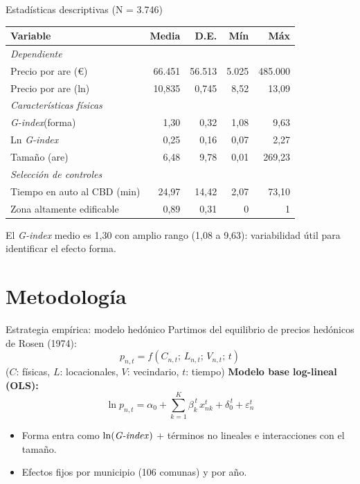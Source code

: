 \documentclass[11pt,aspectratio=169]{beamer}
\newcommand{\Gindex}{\textit{G-index}\xspace}
\begin{document}
\begin{frame}{Estadísticas descriptivas (N = 3.746)}
  \centering
  \begin{table}\small
  \begin{tabular}{lrrrr}
    \toprule
    Variable & Media & D.E. & Mín & Máx \\
    \midrule
    \multicolumn{5}{l}{\itshape Dependiente}\\
    Precio por are (€) & 66.451 & 56.513 & 5.025 & 485.000 \\
    Precio por are (ln) & 10,835 & 0,745 & 8,52 & 13,09 \\
    \midrule
    \multicolumn{5}{l}{\itshape Características físicas}\\
    \Gindex (forma) & 1,30 & 0,32 & 1,08 & 9,63 \\
    Ln \Gindex & 0,25 & 0,16 & 0,07 & 2,27 \\
    Tamaño (are) & 6,48 & 9,78 & 0,01 & 269,23 \\
    \midrule
    \multicolumn{5}{l}{\itshape Selección de controles}\\
    Tiempo en auto al CBD (min) & 24,97 & 14,42 & 2,07 & 73,10 \\
    Zona altamente edificable & 0,89 & 0,31 & 0 & 1 \\
    \bottomrule
  \end{tabular}
  \end{table}
  \vspace{0.4em}
  \footnotesize El \Gindex medio es \alert{1,30} con amplio rango (1,08 a 9,63): variabilidad útil para identificar el efecto forma.
\end{frame}

\section{Metodología}
\begin{frame}{Estrategia empírica: modelo hedónico}
  Partimos del equilibrio de precios hedónicos de Rosen (1974):
  \[ p_{n,t}=f(C_{n,t};\,L_{n,t};\,V_{n,t};\,t) \]
  \footnotesize ($C$: físicas, $L$: locacionales, $V$: vecindario, $t$: tiempo)
  \vspace{0.5em}
  \normalsize
  \textbf{Modelo base log-lineal (OLS):}
  \[ \ln p_{n,t}=\alpha_0+\sum_{k=1}^{K}\beta_k^{\,t}\,x_{nk}^{t}+\delta_0^{\,t}+\varepsilon_n^{t} \]
  \begin{itemize}\small
    \item Forma entra como $\ln(\text{\Gindex})$ + términos no lineales e interacciones con el tamaño.
    \item Efectos fijos por \alert{municipio} (106 comunas) y por \alert{año}.
  \end{itemize}
\end{frame}
\end{document}

